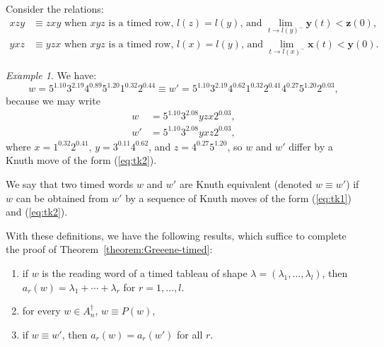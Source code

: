 \documentclass[10pt]{amsproc}
\theoremstyle{definition}
\theoremstyle{remark}
\newtheorem{example}[theorem]{Example}
\begin{document}
Consider the relations:
\begin{align*}
  \tag{$\kappa_1$}
  \label{eq:tk1}
  xzy & \equiv zxy \text{ when $xyz$ is a timed row, $l(z)=l(y)$, and $\lim_{t\to l(y)^-}\mathbf y(t)<\mathbf z(0)$},\\
  \tag{$\kappa_2$}
  \label{eq:tk2}
  yxz & \equiv yzx \text{ when $xyz$ is a timed row, $l(x)=l(y)$, and $\lim_{t\to l(x)^-}\mathbf x(t)<\mathbf y(0)$}.
\end{align*}
\begin{example}
  We have:
  \begin{displaymath}
    w = 5^{1.10}3^{2.19}4^{0.89}5^{1.20}1^{0.32}2^{0.44}\equiv  w' = 5^{1.10}3^{2.19}4^{0.62}1^{0.32}2^{0.41}4^{0.27}5^{1.20}2^{0.03},
  \end{displaymath}
  because we may write
  \begin{align*}
    w & = 5^{1.10}3^{2.08}yzx2^{0.03},\\
    w' & = 5^{1.10}3^{2.08}yxz2^{0.03},
  \end{align*}
  where $x=1^{0.32}2^{0.41}$, $y=3^{0.11}4^{0.62}$, and $z=4^{0.27}5^{1.20}$, so $w$ and $w'$ differ by a Knuth move of the form (\ref{eq:tk2}).
\end{example}
We say that two timed words $w$ and $w'$ are Knuth equivalent (denoted $w\equiv w'$) if $w$ can be obtained from $w'$ by a sequence of Knuth moves of the form (\ref{eq:tk1}) and (\ref{eq:tk2}).

With these definitions, we have the following results, which suffice to complete the proof of Theorem~\ref{theorem:Greeene-timed}:
\begin{enumerate}
\item if $w$ is the reading word of a timed tableau of shape $\lambda=(\lambda_1,\dotsc,\lambda_l)$, then $a_r(w)=\lambda_1+\dotsb+\lambda_r$ for $r=1,\dotsc,l$.
\item for every $w\in A_n^\dagger$, $w\equiv P(w)$,
\item if $w\equiv w'$, then $a_r(w)=a_r(w')$ for all $r$.
\end{enumerate}
\end{document}
